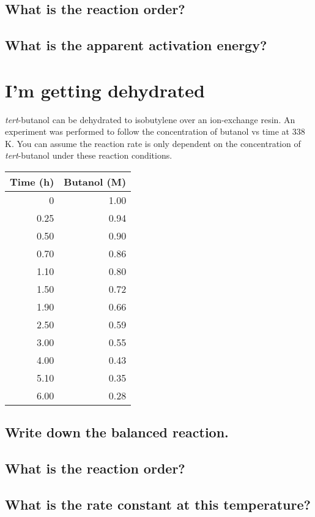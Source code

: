 \documentclass[11pt]{article}
\begin{document}
\subsection{What is the reaction order?}
\label{sec:org0f6fe30}
\subsection{What is the apparent activation energy?}
\label{sec:orgd369e6c}

\section{I'm getting dehydrated}
\label{sec:org826ed74}
\emph{tert}-butanol can be dehydrated to isobutylene over an ion-exchange resin. An experiment was performed to follow the concentration of butanol vs time at 338 K. You can assume the reaction rate is only dependent on the concentration of \emph{tert}-butanol under these reaction conditions.

\begin{center}
\begin{tabular}{rr}
\hline
Time (h) & Butanol (M)\\
\hline
0 & 1.00\\
0.25 & 0.94\\
0.50 & 0.90\\
0.70 & 0.86\\
1.10 & 0.80\\
1.50 & 0.72\\
1.90 & 0.66\\
2.50 & 0.59\\
3.00 & 0.55\\
4.00 & 0.43\\
5.10 & 0.35\\
6.00 & 0.28\\
\hline
\end{tabular}
\end{center}

\subsection{Write down the balanced reaction.}
\label{sec:org6f13789}

\subsection{What is the reaction order?}
\label{sec:org436598f}

\subsection{What is the rate constant at this temperature?}
\label{sec:org5ed83ea}
\end{document}
